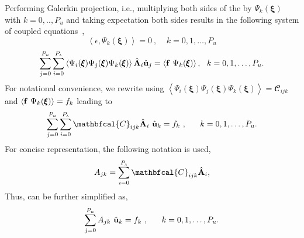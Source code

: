 \documentclass[letter,1p,11pt,oneside,onecolumn,sort&compress]{elsarticle}
\begin{document}
Performing Galerkin projection, i.e., multiplying both sides of the  by ${\Psi_k({\pmb{\xi}})}$ with $k = 0,..,P_{u}$ and taking expectation both sides results in the following system of coupled equations~\cite{ghanemSFEM1991},
\begin{equation}
  \left< \epsilon , {\Psi_k({\pmb{\xi}})} \right> = 0 \ , \ \ \ \ \   k = 0,1,\dots,P_{u}
\end{equation}
\begin{equation}
\sum^{P_{u}}_{j=0} \sum^{P_{\textsc{a}}}_{i=0} \left< {\Psi_i({\pmb{\xi}})} {\Psi_j({\pmb{\xi}})} {\Psi_k({\pmb{\xi}})} \right>  {\hat{{\mathrm{\bf{A}}}}_i}  {\mathrm{\hat{\bf{u}}}_j}    =  \left< {\mathrm{\bf{f}}} \ {\Psi_k({\pmb{\xi}})} \right> , \ \ k = 0,1,\dots,P_{u}.
\label{eq:gpkuf}
\end{equation}
For notational convenience, we rewrite  using $\left< {\Psi_i({\pmb{\xi}})} {\Psi_j({\pmb{\xi}})} {\Psi_k({\pmb{\xi}})} \right> = \mathbfcal{C}_{ijk}$  and $ \left< {\mathrm{\bf{f}}} \ {\Psi_k({\pmb{\xi}})} \right> = f_{k}$ leading to
\begin{equation}
\sum^{P_{u}}_{j=0} \sum^{P_{\textsc{a}}}_{i=0}  \mathbfcal{C}_{ijk} {\hat{{\mathrm{\bf{A}}}}_i} \ {\mathrm{\hat{\bf{u}}}_k}   =  f_{k} \ , \ \ \ \ \   k = 0,1,\dots,P_{u}.
\label{eq:cijkkuf}
\end{equation}
For concise representation, the following notation is used,
\begin{equation}\label{eq:sFEMatrix}
A_{jk} =  \sum^{P_{\textsc{a}}}_{i=0}  \mathbfcal{C}_{ijk} {\hat{{\mathrm{\bf{A}}}}_i},
\end{equation}
Thus,  can be further simplified as,
\begin{equation}
\sum^{P_{u}}_{j=0}  A_{jk}  \ {\mathrm{\hat{\bf{u}}}_k}    = f_k \ ,  \ \ \ \ \   k = 0,1,\dots,P_{u}.
\label{eq:Gakuf}
\end{equation}
\end{document}
